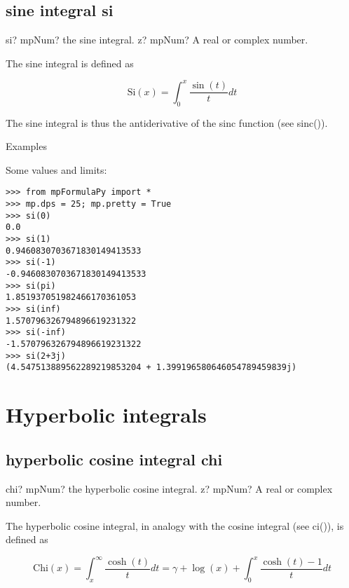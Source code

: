 \subsection{sine integral si}

\begin{mpFunctionsExtract}
	\mpFunctionOne
	{si? mpNum? the sine integral.}
	{z? mpNum? A real or complex number.}
\end{mpFunctionsExtract}


The sine integral is defined as

\begin{equation}
\text{Si}(x)= \int_0^{x} \frac{\sin(t)}{t} dt 
\end{equation}


The sine integral is thus the antiderivative of the sinc function (see sinc()).

Examples

Some values and limits:

\begin{lstlisting}
>>> from mpFormulaPy import *
>>> mp.dps = 25; mp.pretty = True
>>> si(0)
0.0
>>> si(1)
0.9460830703671830149413533
>>> si(-1)
-0.9460830703671830149413533
>>> si(pi)
1.851937051982466170361053
>>> si(inf)
1.570796326794896619231322
>>> si(-inf)
-1.570796326794896619231322
>>> si(2+3j)
(4.547513889562289219853204 + 1.399196580646054789459839j)
\end{lstlisting}



\newpage
\section{Hyperbolic integrals}

\subsection{hyperbolic cosine integral chi}

\begin{mpFunctionsExtract}
	\mpFunctionOne
	{chi? mpNum? the hyperbolic cosine integral.}
	{z? mpNum? A real or complex number.}
\end{mpFunctionsExtract}

\vpara
The hyperbolic cosine integral, in analogy with the cosine integral (see ci()), is defined as

\begin{equation}
\text{Chi}(x)= \int_x^{\infty} \frac{\cosh(t)}{t} dt = \gamma + \log(x) + \int_0^x \frac{\cosh(t)-1}{t} dt
\end{equation}


